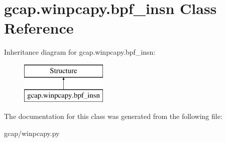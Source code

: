 \hypertarget{classgcap_1_1winpcapy_1_1bpf__insn}{}\section{gcap.\+winpcapy.\+bpf\+\_\+insn Class Reference}
\label{classgcap_1_1winpcapy_1_1bpf__insn}
Inheritance diagram for gcap.\+winpcapy.\+bpf\+\_\+insn\+:\begin{figure}[H]
\begin{center}
\leavevmode
\includegraphics[height=2.000000cm]{db/d05/classgcap_1_1winpcapy_1_1bpf__insn}
\end{center}
\end{figure}


The documentation for this class was generated from the following file\+:\begin{DoxyCompactItemize}
\item 
gcap/winpcapy.\+py\end{DoxyCompactItemize}
